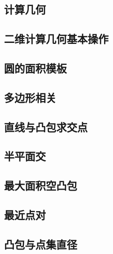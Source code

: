 \documentclass[landscape, twocolumn, 8pt, a4paper, twoside]{extarticle}
\begin{document}
\begin{spacing}{0.1}%
\tableofcontents
\newpage
\section{计算几何}
  \subsection{二维计算几何基本操作}
  

  \subsection{圆的面积模板}
  

  \subsection{多边形相关}
  

  \subsection{直线与凸包求交点}
  

  \subsection{半平面交}
  

  \subsection{最大面积空凸包}
  

  \subsection{最近点对}
  

  \subsection{凸包与点集直径}
  


\end{spacing}
\end{document}
